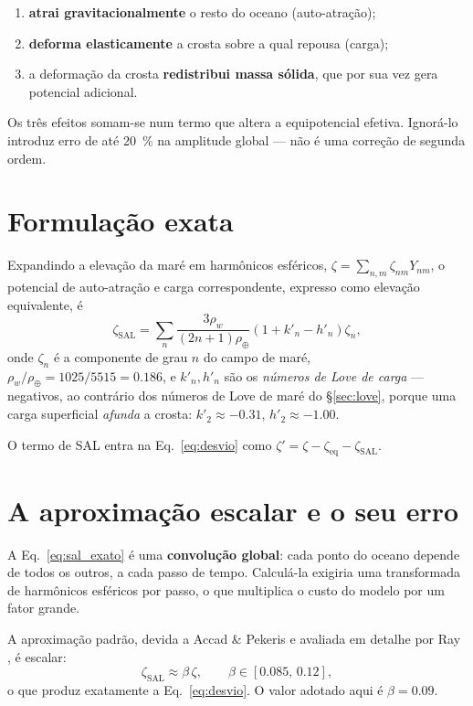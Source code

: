 \documentclass[11pt,a4paper,oneside]{report}
\theoremstyle{definition}
\theoremstyle{plain}
\theoremstyle{remark}
\begin{document}
\begin{enumerate}
\item \textbf{atrai gravitacionalmente} o resto do oceano (auto-atração);
\item \textbf{deforma elasticamente} a crosta sobre a qual repousa (carga);
\item a deformação da crosta \textbf{redistribui massa sólida}, que por sua vez
  gera potencial adicional.
\end{enumerate}

Os três efeitos somam-se num termo que altera a equipotencial efetiva. Ignorá-lo
introduz erro de até \SI{20}{\percent} na amplitude global — não é uma
correção de segunda ordem.

\section{Formulação exata}

Expandindo a elevação da maré em harmônicos esféricos,
$\zeta=\sum_{n,m}\zeta_{nm}Y_{nm}$, o potencial de auto-atração e carga
correspondente, expresso como elevação equivalente, é
\begin{equation}
\boxed{\;
\zeta_{\text{SAL}}=\sum_{n}\frac{3\rho_w}{(2n+1)\rho_\oplus}
\left(1+k'_n-h'_n\right)\zeta_n,\;}
\label{eq:sal_exato}
\end{equation}
onde $\zeta_n$ é a componente de grau $n$ do campo de maré, $\rho_w/\rho_\oplus
=\num{1025}/\num{5515}=\num{0.186}$, e $k'_n,h'_n$ são os \emph{números de Love
de carga} — negativos, ao contrário dos números de Love de maré do
\S\ref{sec:love}, porque uma carga superficial \emph{afunda} a crosta:
$k'_2\approx\num{-0.31}$, $h'_2\approx\num{-1.00}$.

O termo de SAL entra na Eq.~\eqref{eq:desvio} como
$\zeta'=\zeta-\zeta_{\text{eq}}-\zeta_{\text{SAL}}$.

\section{A aproximação escalar e o seu erro}

A Eq.~\eqref{eq:sal_exato} é uma \textbf{convolução global}: cada ponto do
oceano depende de todos os outros, a cada passo de tempo. Calculá-la
exigiria uma transformada de harmônicos esféricos por passo, o que multiplica
o custo do modelo por um fator grande.

A aproximação padrão, devida a Accad \& Pekeris \cite{accad1978} e avaliada em
detalhe por Ray \cite{ray1998}, é escalar:
\begin{equation}
\zeta_{\text{SAL}}\approx\beta\,\zeta,
\qquad\beta\in[\num{0.085},\,\num{0.12}],
\end{equation}
o que produz exatamente a Eq.~\eqref{eq:desvio}. O valor adotado aqui é
$\beta=\num{0.09}$.
\end{document}

